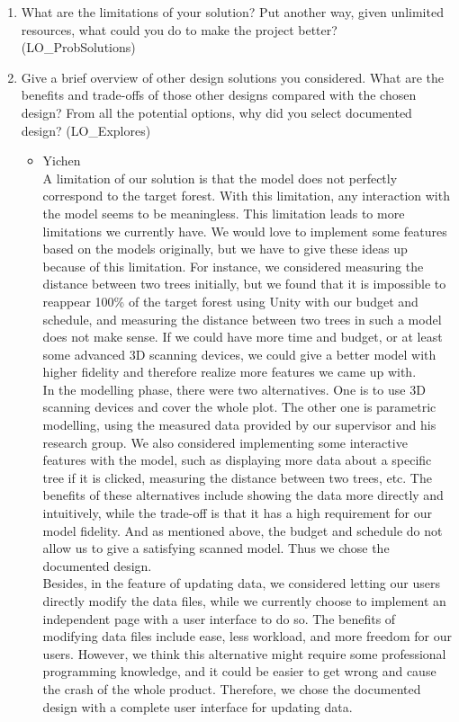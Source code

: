 \documentclass[12pt, titlepage]{article}
\begin{document}
\begin{enumerate}
  \item What are the limitations of your solution?  Put another way, given
  unlimited resources, what could you do to make the project better? (LO\_ProbSolutions)
  \item Give a brief overview of other design solutions you considered.  What
  are the benefits and trade-offs of those other designs compared with the chosen
  design?  From all the potential options, why did you select documented design?
  (LO\_Explores)

\begin{itemize}
    \item Yichen\\ 
A limitation of our solution is that the model does not perfectly correspond to the target forest. With this limitation, any interaction with the model seems to be meaningless. This limitation leads to more limitations we currently have. We would love to implement some features based on the models originally, but we have to give these ideas up because of this limitation. For instance, we considered measuring the distance between two trees initially, but we found that it is impossible to reappear 100\% of the target forest using Unity with our budget and schedule, and measuring the distance between two trees in such a model does not make sense. If we could have more time and budget, or at least some advanced 3D scanning devices, we could give a better model with higher fidelity and therefore realize more features we came up with. \\

In the modelling phase, there were two alternatives. One is to use 3D scanning devices and cover the whole plot. The other one is parametric modelling, using the measured data provided by our supervisor and his research group. We also considered implementing some interactive features with the model, such as displaying more data about a specific tree if it is clicked, measuring the distance between two trees, etc. The benefits of these alternatives include showing the data more directly and intuitively, while the trade-off is that it has a high requirement for our model fidelity. And as mentioned above, the budget and schedule do not allow us to give a satisfying scanned model. Thus we chose the documented design. \\

Besides, in the feature of updating data, we considered letting our users directly modify the data files, while we currently choose to implement an independent page with a user interface to do so. The benefits of modifying data files include ease, less workload, and more freedom for our users. However, we think this alternative might require some professional programming knowledge, and it could be easier to get wrong and cause the crash of the whole product. Therefore, we chose the documented design with a complete user interface for updating data. \\
    

\end{itemize}
\end{enumerate}
\end{document}
